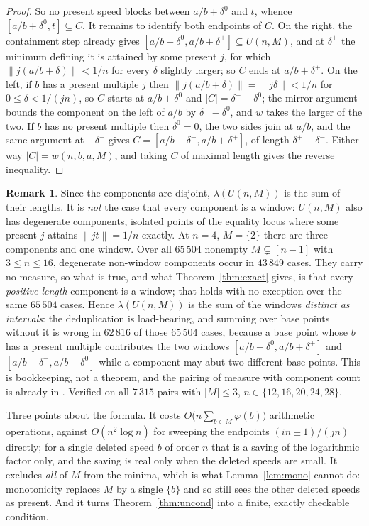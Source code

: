 \documentclass[11pt]{amsart}
\theoremstyle{plain}
\theoremstyle{definition}
\newtheorem{remark}[theorem]{Remark}
\newcommand{\nrm}[1]{\left\lVert #1 \right\rVert}
\begin{document}
\begin{proof}
So no present speed blocks between $a/b+\delta^{0}$ and $t$, whence $[a/b+\delta^{0},t]\subseteq C$.
It remains to identify both endpoints of $C$. On the right, the containment step already gives
$[a/b+\delta^{0},a/b+\delta^{+}]\subseteq U(n,M)$, and at $\delta^{+}$ the minimum defining it is
attained by some present $j$, for which $\nrm{j(a/b+\delta)}<1/n$ for every $\delta$ slightly larger;
so $C$ ends at $a/b+\delta^{+}$. On the left, if $b$ has a present multiple $j$ then
$\nrm{j(a/b+\delta)}=\nrm{j\delta}<1/n$ for $0\le\delta<1/(jn)$, so $C$ starts at $a/b+\delta^{0}$
and $|C|=\delta^{+}-\delta^{0}$; the mirror argument bounds the component on the left of $a/b$ by
$\delta^{-}-\delta^{0}$, and $w$ takes the larger of the two. If $b$ has no present multiple then
$\delta^{0}=0$, the two sides join at $a/b$, and the same argument at $-\delta^{-}$ gives
$C=[a/b-\delta^{-},a/b+\delta^{+}]$, of length $\delta^{+}+\delta^{-}$. Either way
$|C|=w(n,b,a,M)$, and taking $C$ of maximal length gives the reverse inequality.
\end{proof}

\begin{remark}\label{rem:measeq}
Since the components are disjoint, $\lambda(U(n,M))$ is the sum of their lengths. It is
\emph{not} the case that every component is a window: $U(n,M)$ also has degenerate components,
isolated points of the equality locus where some present $j$ attains $\nrm{jt}=1/n$ exactly. At
$n=4$, $M=\{2\}$ there are three components and one window. Over all $65\,504$ nonempty
$M\subsetneq[n-1]$ with $3\le n\le16$, degenerate non-window components occur in $43\,849$ cases.
They carry no measure, so what is true, and what Theorem~\ref{thm:exact} gives, is that every
\emph{positive-length} component is a window; that holds with no exception over the same $65\,504$
cases. Hence $\lambda(U(n,M))$ is the sum of the windows \emph{distinct as intervals}: the
deduplication is load-bearing, and summing over base points without it is wrong in $62\,816$ of
those $65\,504$ cases, because a base point whose $b$ has a present multiple contributes the two
windows $[a/b+\delta^{0},a/b+\delta^{+}]$ and $[a/b-\delta^{-},a/b-\delta^{0}]$ while a component
may abut two different base points. This is bookkeeping, not a theorem, and the pairing of measure
with component count is already in \cite[Lemma~1]{cp}. Verified on all $7\,315$ pairs with
$|M|\le3$, $n\in\{12,16,20,24,28\}$.
\end{remark}

Three points about the formula. It costs $O\bigl(n\sum_{b\in M}\varphi(b)\bigr)$ arithmetic
operations, against $O(n^{2}\log n)$ for sweeping the endpoints $(in\pm1)/(jn)$ directly; for a
single deleted speed $b$ of order $n$ that is a saving of the logarithmic factor only, and the
saving is real only when the deleted speeds are small. It excludes \emph{all} of $M$ from the minima,
which is what Lemma~\ref{lem:mono} cannot do: monotonicity replaces $M$ by a single $\{b\}$ and so
still sees the other deleted speeds as present. And it turns Theorem~\ref{thm:uncond} into a finite,
exactly checkable condition.
\end{document}
